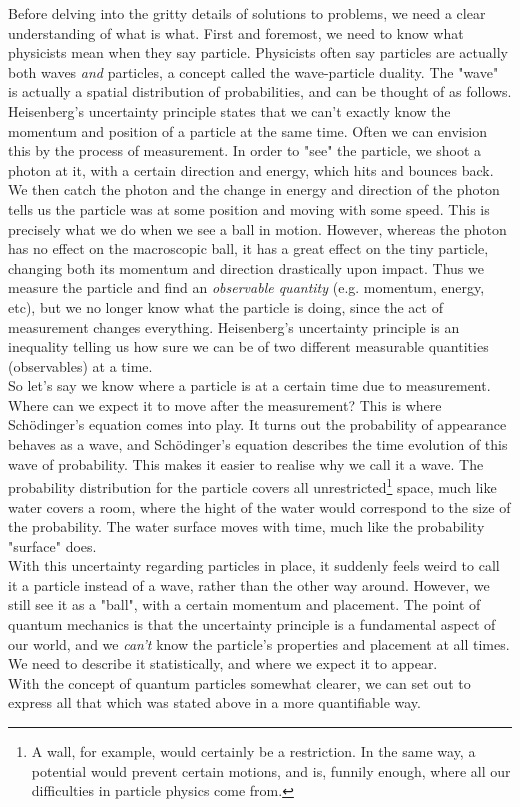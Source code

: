 \documentclass[10pt]{report}
\begin{document}
	Before delving into the gritty details of solutions to problems, we need a clear understanding of what is what. First and foremost, we need to know what physicists mean when they say particle. Physicists often say particles are actually both waves \emph{and} particles, a concept called the wave-particle duality. The "wave" is actually a spatial distribution of probabilities, and can be thought of as follows.\\
	Heisenberg's uncertainty principle states that we can't exactly know the momentum and position of a particle at the same time. Often we can envision this by the process of measurement. In order to "see" the particle, we shoot a photon at it, with a certain direction and energy, which hits and bounces back. We then catch the photon and the change in energy and direction of the photon tells us the particle was at some position and moving with some speed. This is precisely what we do when we see a ball in motion. However, whereas the photon has no effect on the macroscopic ball, it has a great effect on the tiny particle, changing both its momentum and direction drastically upon impact. Thus we measure the particle and find an \emph{observable quantity} (e.g. momentum, energy, etc), but we no longer know what the particle is doing, since the act of measurement changes everything. Heisenberg's uncertainty principle is an inequality telling us how sure we can be of two different measurable quantities (observables) at a time.\\
	So let's say we know where a particle is at a certain time due to measurement. Where can we expect it to move after the measurement? This is where Sch\"odinger's equation comes into play. It turns out the probability of appearance behaves as a wave, and Sch\"odinger's equation describes the time evolution of this wave of probability. This makes it easier to realise why we call it a wave. The probability distribution for the particle covers all unrestricted\footnote{A wall, for example, would certainly be a restriction. In the same way, a potential would prevent certain motions, and is, funnily enough, where all our difficulties in particle physics come from.} space, much like water covers a room, where the hight of the water would correspond to the size of the probability. The water surface moves with time, much like the probability "surface" does.\\
	
	With this uncertainty regarding particles in place, it suddenly feels weird to call it a particle instead of a wave, rather than the other way around. However, we still see it as a "ball", with a certain momentum and placement. The point of quantum mechanics is that the uncertainty principle is a fundamental aspect of our world, and we \emph{can't} know the particle's properties and placement at all times. We need to describe it statistically, and where we expect it to appear.\\
	With the concept of quantum particles somewhat clearer, we can set out to express all that which was stated above in a more quantifiable way.
	
\end{document}
